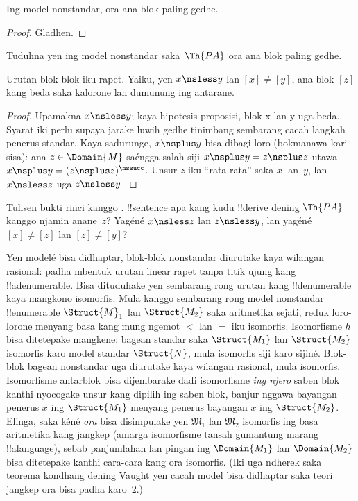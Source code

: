 \documentclass[../../../include/open-logic-section]{subfiles}
\begin{document}
\begin{prop}
Ing model nonstandar,
ora ana blok paling gedhe.
\end{prop}

\begin{proof}
Gladhen.
\end{proof}

\begin{prob}
Tuduhna yen ing model
nonstandar saka~$\Th{PA}$
ora ana blok paling gedhe.
\end{prob}

\begin{prop}
Urutan blok-blok iku rapet.
Yaiku, yen
$x \nsless y$
lan $[x] \neq [y]$,
ana blok $[z]$
kang beda saka kalorone
lan dumunung ing antarane.
\end{prop}

\begin{proof}
Upamakna $x \nsless y$; kaya hipotesis proposisi, blok x lan y uga beda. Syarat iki perlu supaya jarake luwih gedhe tinimbang sembarang cacah langkah penerus standar.
Kaya sadurunge,
$x \nsplus y$
bisa dibagi loro
(bokmanawa kari sisa):
ana $z \in \Domain{M}$
saéngga salah siji
$x \nsplus y = z \nsplus z$
utawa
$x \nsplus y = (z \nsplus
z)^\nssucc$.
Unsur $z$ iku
“rata-rata” saka $x$
lan~$y$,
lan $x \nsless z$
uga $z \nsless y$.
\end{proof}

\begin{prob}
Tulisen bukti rinci kanggo
.
!!{sentence} apa kang kudu
!!{derive} dening
$\Th{PA}$
kanggo njamin anane~$z$?
Yagéné
$x \nsless z$
lan $z \nsless y$,
lan yagéné
$[x] \neq [z]$
lan $[z]
\neq [y]$?
\end{prob}

\begin{explain}
Yen modelé bisa didhaptar,
blok-blok nonstandar
diurutake kaya wilangan rasional:
padha mbentuk
urutan linear rapet
tanpa titik ujung kang
!!a{denumerable}.
Bisa dituduhake yen
sembarang rong urutan kang
!!{denumerable}
kaya mangkono isomorfis.
Mula kanggo sembarang
rong model nonstandar
!!{enumerable}
$\Struct{M}_1$
lan $\Struct{M_2}$
saka aritmetika sejati,
reduk loro-lorone
menyang basa kang
mung ngemot $<$
lan $=$ iku isomorfis.
Isomorfisme $h$
bisa ditetepake mangkene:
bagean standar saka
$\Struct{M_1}$ lan
$\Struct{M_2}$
isomorfis karo model
standar $\Struct{N}$,
mula isomorfis
siji karo sijiné.
Blok-blok bagean nonstandar
uga diurutake kaya
wilangan rasional,
mula isomorfis.
Isomorfisme antarblok
bisa dijembarake dadi
isomorfisme
\emph{ing njero}
saben blok kanthi
nyocogake unsur kang
dipilih ing saben blok,
banjur nggawa bayangan
penerus $x$
ing $\Struct{M_1}$
menyang penerus bayangan
$x$ ing $\Struct{M_2}$.
Elinga, saka kéné
\emph{ora} bisa disimpulake
yen $\mathfrak{M}_1$
lan $\mathfrak{M}_2$
isomorfis ing basa
aritmetika kang jangkep
(amarga isomorfisme
tansah gumantung marang
!!a{language}),
sebab panjumlahan
lan pingan ing
$\Domain{M_1}$
lan $\Domain{M_2}$
bisa ditetepake kanthi
cara-cara kang ora isomorfis.
(Iki uga ndherek
saka teorema kondhang
dening Vaught yen
cacah model bisa didhaptar
saka teori jangkep
ora bisa padha karo~2.)
\end{explain}
\end{document}
